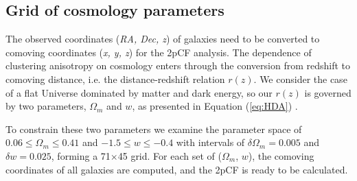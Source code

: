 \documentclass[iop]{emulateapj}
\begin{document}





\subsection{Grid of cosmology parameters}

The observed coordinates ({\it RA, Dec, z}) of galaxies
need to be converted to comoving coordinates ({\it x, y, z}) for the 2pCF analysis.
The dependence of clustering anisotropy on cosmology enters through the conversion from redshift to comoving distance,
i.e. the distance-redshift relation $r(z)$.
We consider the case of a flat Universe dominated by matter and dark energy,
so our $r(z)$ is governed by two parameters, $\Omega_m$ and $w$, as presented in Equation (\ref{eq:HDA})	.

To constrain these two parameters we examine the parameter space of 
$0.06\leq \Omega_m\leq 0.41$ and $-1.5 \leq w \leq -0.4$ with intervals of 
$\delta \Omega_m = 0.005$ and $\delta w = 0.025$,
forming a 71$\times$45 grid.
For each set of ($\Omega_m$, $w$), 
the comoving coordinates of all galaxies are computed, 
and the 2pCF is ready to be calculated.
\end{document}
